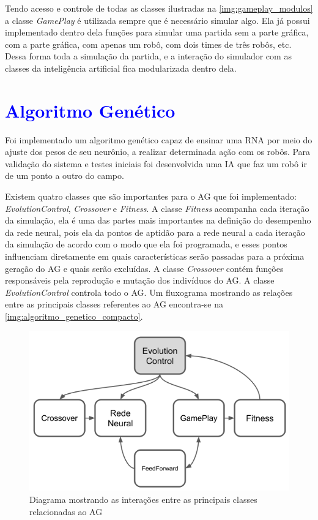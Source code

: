 Tendo acesso e controle de todas as classes ilustradas na \autoref{img:gameplay_modulos} a classe \textit{GamePlay} é utilizada sempre que é necessário simular algo. Ela já possui implementado dentro dela funções para simular uma partida sem a parte gráfica, com a parte gráfica, com apenas um robô, com dois times de três robôs, etc. Dessa forma toda a simulação da partida, e a interação do simulador com as classes da inteligência artificial fica modularizada dentro dela.

\section{\textcolor{blue}{\label{cap:algoritmo_genetico}Algoritmo Genético}}

Foi implementado um algoritmo genético capaz de ensinar uma RNA por meio do ajuste dos pesos de seu neurônio, a realizar determinada ação com os robôs. Para validação do sistema e testes iniciais foi desenvolvida uma IA que faz um robô ir de um ponto a outro do campo.

Existem quatro classes que são importantes para o AG que foi implementado: \textit{EvolutionControl}, \textit{Crossover} e \textit{Fitness}. A classe \textit{Fitness} acompanha cada iteração da simulação, ela é uma das partes mais importantes na definição do desempenho da rede neural, pois ela da pontos de aptidão para a rede neural a cada iteração da simulação de acordo com o modo que ela foi programada, e esses pontos influenciam diretamente em quais características serão passadas para a próxima geração do AG e quais serão excluídas. A classe \textit{Crossover} contém funções responsáveis pela reprodução e mutação dos indivíduos do AG. A classe \textit{EvolutionControl} controla todo o AG. Um fluxograma mostrando as relações entre as principais classes referentes ao AG encontra-se na \autoref{img:algoritmo_genetico_compacto}.

\begin{figure}[!htb]
    \caption{\label{img:algoritmo_genetico_compacto}Diagrama mostrando as interações entre as principais classes relacionadas ao AG}
	\begin{center}
        \includegraphics[scale=0.75]{img/ag_compacto.png}
	\end{center}
\end{figure}


